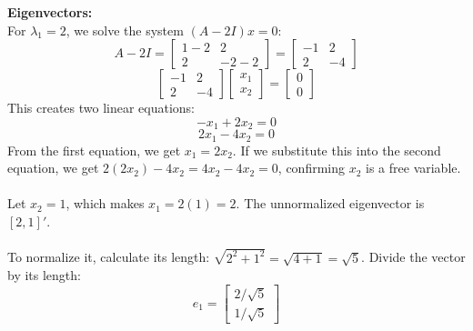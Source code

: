 \documentclass{article}
\begin{document}
\noindent \textbf{Eigenvectors:} \\
For $\lambda_1 = 2$, we solve the system $(A - 2I)x = 0$:
\[
A - 2I = \begin{bmatrix} 1-2 & 2 \\ 2 & -2-2 \end{bmatrix} = \begin{bmatrix} -1 & 2 \\ 2 & -4 \end{bmatrix}
\]
\[
\begin{bmatrix} -1 & 2 \\ 2 & -4 \end{bmatrix} \begin{bmatrix} x_1 \\ x_2 \end{bmatrix} = \begin{bmatrix} 0 \\ 0 \end{bmatrix}
\]
This creates two linear equations:
\[
-x_1 + 2x_2 = 0
\]
\[
2x_1 - 4x_2 = 0
\]
From the first equation, we get $x_1 = 2x_2$. If we substitute this into the second equation, we get $2(2x_2) - 4x_2 = 4x_2 - 4x_2 = 0$, confirming $x_2$ is a free variable. \\ \\
Let $x_2 = 1$, which makes $x_1 = 2(1) = 2$. The unnormalized eigenvector is $[2, 1]'$. \\ \\
To normalize it, calculate its length: $\sqrt{2^2 + 1^2} = \sqrt{4 + 1} = \sqrt{5}$. Divide the vector by its length:
\[
e_1 = \begin{bmatrix} 2/\sqrt{5} \\ 1/\sqrt{5} \end{bmatrix}
\]
\end{document}
